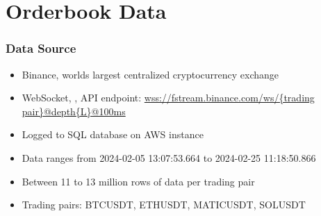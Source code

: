 \documentclass[handout]{beamer}
\begin{document}
\section{Orderbook Data}
\begin{frame}
    \frametitle{Data Source}
     \begin{itemize}
        \item Binance, worlds largest centralized cryptocurrency exchange
        \item WebSocket, {\color{blue}\cite{WEBSOCKET2011}}, API endpoint:  \url{wss://fstream.binance.com/ws/{trading pair}@depth{L}@100ms}
        \item Logged to SQL database on AWS instance
        \item Data ranges from 2024-02-05 13:07:53.664 to 2024-02-25 11:18:50.866
        \item Between 11 to 13 million rows of data per trading pair
        \item Trading pairs: BTCUSDT, ETHUSDT, MATICUSDT, SOLUSDT
    \end{itemize}
    
\end{frame}
\end{document}

